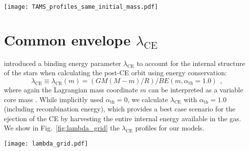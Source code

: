 \documentclass[twocolumn,twocolappendix,trackchanges]{aastex63}
\DeclareRobustCommand{\Figref}[1]{Fig.~\ref{#1}}
\begin{document}
\begin{figure*}[htbp]
  \centering
  \texttt{[image: TAMS\_profiles\_same\_initial\_mass.pdf]}
  \caption{Specific entropy (top row), H (bottom row, solid lines),
    and He (bottom row, dashed lines) profiles for non-rotating single
    stars (red), accretors (orange), and ``engineered'' models of the
    same total mass as the ZAMS mass of the accretors. The overlapping
    gray bands emphasize the CEB region.}
  \label{fig:TAMS_profiles_same_initial_mass}
\end{figure*}

\section{Common envelope $\lambda_\mathrm{CE}$}
\label{sec:pop_synth_app}

\cite{dekool:1990} introduced a binding energy parameter
$\lambda_\mathrm{CE}$ to account for the internal structure of the
stars when calculating the post-CE orbit using energy conservation:
\begin{equation}
  \label{eq:lambda}
  \lambda_\mathrm{CE} \equiv \lambda_\mathrm{CE}(m) = (GM(M-m)/R)/BE(m, \alpha_\mathrm{th}=1.0) \ \ ,
\end{equation}
where again the Lagrangian mass coordinate $m$ can be interpreted as a
variable core mass \citep[see also][]{demarco:11, ivanova:2013}. While
\cite{dekool:1990} implicitly used
  $\alpha_\mathrm{th}=0$, we calculate $\lambda_\mathrm{CE}$ with
  $\alpha_\mathrm{th}=1.0$ (including recombination energy), which provides a best case scenario for
  the ejection of the CE by harvesting the entire internal energy
  available in the gas. We show
in \Figref{fig:lambda_grid} the $\lambda_\mathrm{CE}$ profiles for our models.

\begin{figure*}[htbp]
  \centering
  \texttt{[image: lambda\_grid.pdf]}
  \caption{Profile of the binding energy parameter
    $\lambda_\mathrm{CE}$ as a function of mass coordinate for
    accretors (orange), single stars (red), and our engineered stars
    (other colors) at selected total radii. The vertical lines
    mark the outer edge of the helium cores of the accretor and single
    star, that is the outermost location where $Y>0.1$ and $X<0.01$
    (solid lines), or $X<0.1$ (dashed), or $X<0.2$ (dot-dashed).}
  \label{fig:lambda_grid}
\end{figure*}
\end{document}

